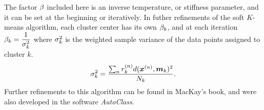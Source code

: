 The factor \(\beta\) included here is an inverse temperature, or stiffness 
parameter, and it can be set at the beginning or iteratively.  In futher 
refinements of the soft $K$-means algorithm, each cluster center has its own
\(\beta_k\), and at each iteration \(\beta_k = \dfrac{1}{\sigma_k^2}\) where 
\(\sigma_k^{2}\) is the weighted sample variance of the data points assigned to 
cluster $k$.
\begin{equation}\label{isoSigma}
\sigma_k^{2} = \frac{\sum_n r_k^{(n)}d(\bm x^{(n)},\bm m_k)^2}{N_k}.
\end{equation}
Further refinements to this algorithm can be found in MacKay's book, and were 
also developed in the software \textit{AutoClass}. \cite{MacKay2002,AutoClass1,AutoClass2}
